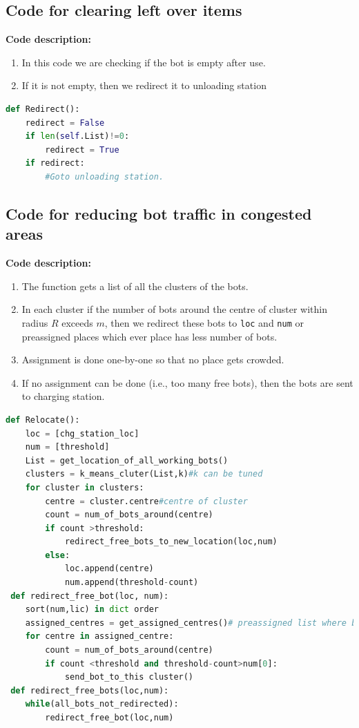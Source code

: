 \documentclass{article}
\begin{document}
\subsection{Code for clearing left over items}
\label{code:g}
\textbf{Code description: }
\begin{enumerate}
\item In this code we are checking if the bot is empty after use.
\item If it is not empty, then we redirect it to unloading station
\end{enumerate}
\begin{lstlisting}[language=Python, caption=Clearing left over items]
def Redirect():
    redirect = False
    if len(self.List)!=0:
        redirect = True
    if redirect:
        #Goto unloading station.    
\end{lstlisting}
\subsection{Code for reducing bot traffic in congested areas}
\label{code:h}
\textbf{Code description: }
\begin{enumerate}
\item The function gets a list of all the clusters of the bots.
\item In each cluster if the number of bots around the centre of cluster within radius $R$ exceeds $m$, then we redirect these bots to \lstinline[language=Python]{loc} and \lstinline[language=Python]{num} or preassigned places which ever place has less number of bots.
\item Assignment is done one-by-one so that no place gets crowded.
\item If no assignment can be done (i.e., too many free bots), then the bots are sent to charging station.
\end{enumerate}
\begin{lstlisting}[language=Python, caption=Reducing bot traffic in congested areas]
def Relocate():
    loc = [chg_station_loc]
    num = [threshold]
    List = get_location_of_all_working_bots()
    clusters = k_means_cluter(List,k)#k can be tuned
    for cluster in clusters:
        centre = cluster.centre#centre of cluster
        count = num_of_bots_around(centre)
        if count >threshold:
            redirect_free_bots_to_new_location(loc,num)
        else:
            loc.append(centre)
            num.append(threshold-count)
 def redirect_free_bot(loc, num):
    sort(num,lic) in dict order
    assigned_centres = get_assigned_centres()# preassigned list where bots can form a cluster
    for centre in assigned_centre:
        count = num_of_bots_around(centre)
        if count <threshold and threshold-count>num[0]:
            send_bot_to_this cluster()
 def redirect_free_bots(loc,num):
    while(all_bots_not_redirected):
        redirect_free_bot(loc,num)
            
\end{lstlisting}
\end{document}
